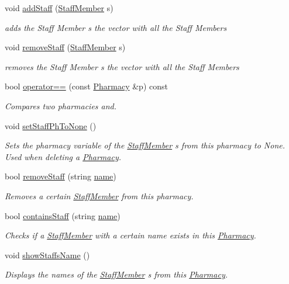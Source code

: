 \begin{DoxyCompactItemize}
void \hyperlink{classPharmacy_ac98f1404e96ea1560824afb612b1cab9}{add\+Staff} (\hyperlink{classStaffMember}{Staff\+Member} s)
\begin{DoxyCompactList}\small\item\em adds the Staff Member s the vector with all the Staff Members \end{DoxyCompactList}\item 
void \hyperlink{classPharmacy_ad1af6e62246f3060f922b4479d4d06bf}{remove\+Staff} (\hyperlink{classStaffMember}{Staff\+Member} s)
\begin{DoxyCompactList}\small\item\em removes the Staff Member s the vector with all the Staff Members \end{DoxyCompactList}\item 
bool \hyperlink{classPharmacy_acb5226880a626031aab93724949fa0e0}{operator==} (const \hyperlink{classPharmacy}{Pharmacy} \&p) const
\begin{DoxyCompactList}\small\item\em Compares two pharmacies and. \end{DoxyCompactList}\item 
void \hyperlink{classPharmacy_abdc810233f809eeab66fce0d443f1ba8}{set\+Staff\+Ph\+To\+None} ()
\begin{DoxyCompactList}\small\item\em Sets the pharmacy variable of the \hyperlink{classStaffMember}{Staff\+Member} \textquotesingle{}s from this pharmacy to None. Used when deleting a \hyperlink{classPharmacy}{Pharmacy}. \end{DoxyCompactList}\item 
bool \hyperlink{classPharmacy_a1fe770db0e60d644098750463cb2b8ee}{remove\+Staff} (string \hyperlink{classEntity_afb45718695f537c330a463168616c262}{name})
\begin{DoxyCompactList}\small\item\em Removes a certain \hyperlink{classStaffMember}{Staff\+Member} from this pharmacy. \end{DoxyCompactList}\item 
bool \hyperlink{classPharmacy_ababdb13d48f6e2c24e9a954f545bbeef}{contains\+Staff} (string \hyperlink{classEntity_afb45718695f537c330a463168616c262}{name})
\begin{DoxyCompactList}\small\item\em Checks if a \hyperlink{classStaffMember}{Staff\+Member} with a certain name exists in this \hyperlink{classPharmacy}{Pharmacy}. \end{DoxyCompactList}\item 
void \hyperlink{classPharmacy_addd2f907762d398ed28dba68eb4eaa66}{show\+Staffs\+Name} ()
\begin{DoxyCompactList}\small\item\em Displays the names of the \hyperlink{classStaffMember}{Staff\+Member} \textquotesingle{}s from this \hyperlink{classPharmacy}{Pharmacy}. \end{DoxyCompactList}\end{DoxyCompactItemize}
